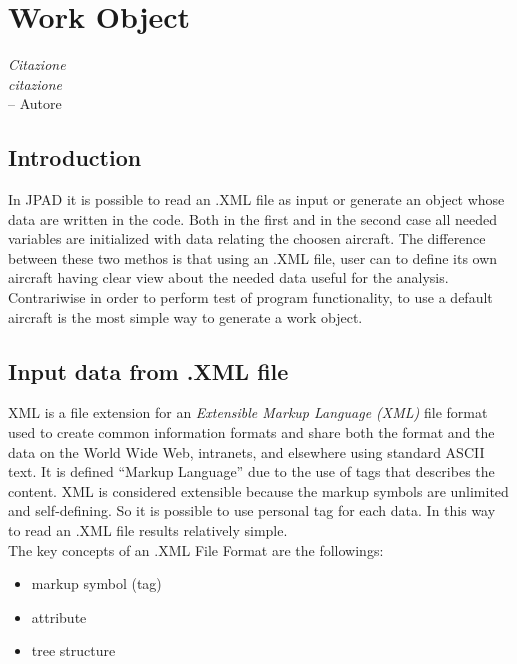 \chapter{Work Object}%
\label{ch:workobject}

\begin{flushright}
	{\smaller
		\textit{Citazione\\ citazione}\\
		-- Autore}
\end{flushright}

\section {Introduction}
In JPAD it is possible to read an .XML file as input or generate an object whose data are written in the code. Both in the first and in the second case all needed variables are initialized with data relating the choosen aircraft. The difference between these two methos is that using an .XML file, user can to define its own aircraft having clear view about the needed data useful for the analysis.\\
Contrariwise in order to perform test of program functionality, to use a default aircraft is the most simple way to generate a work object.

\section {Input data from .XML file}
XML is a file extension for an {\itshape Extensible Markup Language (XML)} file format used to create common information formats and share both the format and the data on the World Wide Web, intranets, and elsewhere using standard ASCII text.
It is defined ``Markup Language'' due to the use of tags that describes the content. XML is considered extensible because the markup symbols are unlimited and self-defining. So it is possible to use personal tag for each data. In this way to read an .XML file results relatively simple.\cite{wiki:xml}\\
The key concepts of an .XML File Format are the followings:
\begin{itemize}
\item markup symbol (tag)
\item attribute
\item tree structure
\end{itemize}

